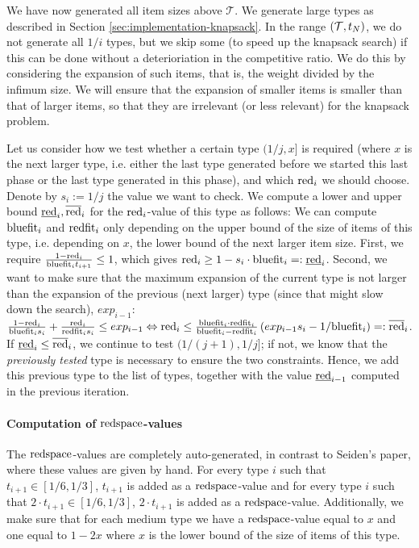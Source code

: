 We have now generated all item sizes above $\mathcal{T}$. 
We generate large types as described in Section \ref{sec:implementation-knapsack}.
In the range $(\mathcal{T},t_N)$, we do not generate all $1/i$ types, but we skip some (to speed up the knapsack search) if this can be done without a deterioriation in the competitive ratio. We do this by considering the expansion of such items, that is, the weight divided by the infimum size. We will ensure that the expansion of smaller items is smaller than that of larger items, so that they are irrelevant (or less relevant) for the knapsack problem.

Let us consider how we test whether a certain type $(1/j,x]$ is required (where $x$ is the next larger type, i.e. either the last type generated before we started this last phase or the last type generated in this phase), and which $\mathrm{red}_i$ we should choose. Denote by $s_i := 1/j$ the value we want to check. We compute a lower and upper bound $\underline{\mathrm{red}}_i, \overline{\mathrm{red}}_i$ for the $\mathrm{red}_i$-value of this type as follows: We can compute $\mathrm{bluefit}_i$ and $\mathrm{redfit}_i$ only depending on the upper bound of the size of items of this type, i.e. depending on $x$, the lower bound of the next larger item size. First, we require $\frac{1-\mathrm{red}_i}{\mathrm{bluefit}_it_{i+1}} \le 1$, which gives $\mathrm{red}_i \ge 1-s_i\cdot \mathrm{bluefit}_i =: \underline{\mathrm{red}}_i$. Second, we want to make sure that the maximum expansion of the current type is not larger than the expansion of the previous (next larger) type (since that might slow down the search), $exp_{i-1}$: $\frac{1-\mathrm{red}_i}{\mathrm{bluefit}_is_i} + \frac{\mathrm{red}_i}{\mathrm{redfit}_is_i} \le exp_{i-1} \Leftrightarrow \mathrm{red}_i \le \frac{\mathrm{bluefit}_i\cdot\mathrm{redfit}_i}{\mathrm{bluefit}_i-\mathrm{redfit}_i} \left(exp_{i-1}s_i - 1/\mathrm{bluefit}_i\right) =: \overline{\mathrm{red}}_i$. If $\underline{\mathrm{red}}_i \le \overline{\mathrm{red}}_i$, we continue to test $(1/(j+1),1/j]$; if not, we know that the \textit{previously tested} type is necessary to ensure the two constraints. Hence, we add this previous type to the list of types, together with the value $\underline{\mathrm{red}}_{i-1}$ computed in the previous iteration.

\paragraph{Computation of $\mathrm{redspace}$-values}
The $\mathrm{redspace}$-values are completely auto-generated, in contrast to Seiden's paper, where these values are given by hand. For every type $i$ such that $t_{i+1} \in [1/6, 1/3]$, $t_{i+1}$ is added as a $\mathrm{redspace}$-value and for every type $i$ such that $2\cdot t_{i+1} \in [1/6, 1/3]$, $2\cdot t_{i+1}$ is added as a $\mathrm{redspace}$-value.
Additionally, we make sure that for each medium type we have a $\mathrm{redspace}$-value equal to $x$ and one equal to $1-2x$ where $x$ is the lower bound of the size of items of this type.

